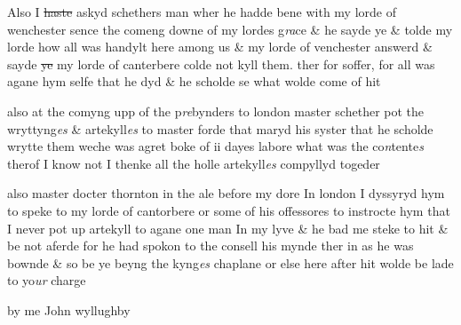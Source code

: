\documentclass[12pt, a4paper]{book}
\begin{document}
 	
				\marginpar[\vspace{0.5cm}{\textcolor{Gray}{n}}]{}
			
 		
				\marginpar[\vspace{0.5cm}{\textcolor{Gray}{n}}]{}
			
 		
		\ifthenelse{\isodd{\thepage}}
		{\reversemarginpar}
		{\normalmarginpar}
		Also I \sout{haste} askyd
			 schethers man wher he hadde bene with my lorde of
 			wenchester sence the comeng downe of my lordes g\textit{ra}ce
			 \& he sayde ye
 			\& tolde my lorde how all was handylt here among us \& my
 				lorde of venchester answerd \& sayde \sout{ye} my lorde of canterbere
			 colde not kyll them. ther for
 soffer, for all was agane hym selfe that he dyd \& he scholde
 se what wolde come of hit
 	
		\ifthenelse{\isodd{\thepage}}
		{\reversemarginpar}
		{\normalmarginpar}
		also at the comyng upp of the p\textit{re}bynders to london master
 schether pot the wryttyng\textit{es} \& artekyll\textit{es} to master forde that
 maryd his syster that he scholde wrytte them weche was agret
 boke of ii dayes labore what was the co\textit{n}tente\textit{s} therof I know not
 I thenke all the holle artekyll\textit{es} compyllyd togeder
 	 
				\marginpar[\vspace{0.5cm}{\textcolor{Gray}{D. Thorndene}}]{}
			 
		\ifthenelse{\isodd{\thepage}}
		{\reversemarginpar}
		{\normalmarginpar}
		also master docter thornton in the ale before my dore In london
 		I dyssyryd hym to speke to my lorde of cantorbere or some of his
 offessores to instrocte hym that I never pot up artekyll to
 agane one man In my lyve \& he bad me steke to hit \& be not aferde
 for he had spokon to the consell his mynde ther in as he was
 bownde \& so be ye beyng the kyng\textit{es} chaplane or else here
 after hit wolde be lade to yo\textit{ur} charge
 	
		\ifthenelse{\isodd{\thepage}}
		{\reversemarginpar}
		{\normalmarginpar}
		by me John wyllughby

\dotfill
					  \section*{}  \subsection*{}
\end{document}
